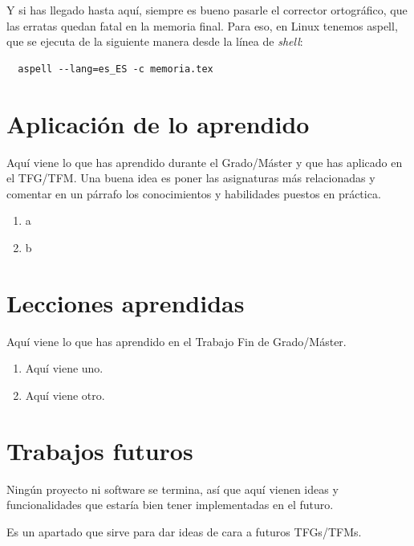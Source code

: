 \documentclass[a4paper, 12pt]{book}
\begin{document}
Y si has llegado hasta aquí, siempre es bueno pasarle el corrector ortográfico, que las erratas quedan fatal en la memoria final.
Para eso, en Linux tenemos aspell, que se ejecuta de la siguiente manera desde la línea de \emph{shell}:

\begin{verbatim}
  aspell --lang=es_ES -c memoria.tex
\end{verbatim}

\section{Aplicación de lo aprendido}
\label{sec:aplicacion}

Aquí viene lo que has aprendido durante el Grado/Máster y que has aplicado en el TFG/TFM.
Una buena idea es poner las asignaturas más relacionadas y comentar en un párrafo los conocimientos y habilidades puestos en práctica.

\begin{enumerate}
  \item a
  \item b
\end{enumerate}


\section{Lecciones aprendidas}
\label{sec:lecciones_aprendidas}

Aquí viene lo que has aprendido en el Trabajo Fin de Grado/Máster.

\begin{enumerate}
  \item Aquí viene uno.
  \item Aquí viene otro.
\end{enumerate}


\section{Trabajos futuros}
\label{sec:trabajos_futuros}

Ningún proyecto ni software se termina, así que aquí vienen ideas y funcionalidades que estaría bien tener implementadas en el futuro.

Es un apartado que sirve para dar ideas de cara a futuros TFGs/TFMs.


\end{document}
